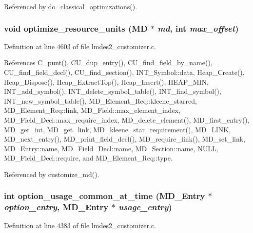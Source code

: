 Referenced by do\_\-classical\_\-optimizations().
\subsubsection{\setlength{\rightskip}{0pt plus 5cm}void optimize\_\-resource\_\-units (\bf{MD} $\ast$ {\em md}, int {\em max\_\-offset})}\label{lmdes2__customizer_8c_2160faed9e117c61232adfb550843aaa}




Definition at line 4603 of file lmdes2\_\-customizer.c.

References C\_\-punt(), CU\_\-dup\_\-entry(), CU\_\-find\_\-field\_\-by\_\-name(), CU\_\-find\_\-field\_\-decl(), CU\_\-find\_\-section(), INT\_\-Symbol::data, Heap\_\-Create(), Heap\_\-Dispose(), Heap\_\-Extract\-Top(), Heap\_\-Insert(), HEAP\_\-MIN, INT\_\-add\_\-symbol(), INT\_\-delete\_\-symbol\_\-table(), INT\_\-find\_\-symbol(), INT\_\-new\_\-symbol\_\-table(), MD\_\-Element\_\-Req::kleene\_\-starred, MD\_\-Element\_\-Req::link, MD\_\-Field::max\_\-element\_\-index, MD\_\-Field\_\-Decl::max\_\-require\_\-index, MD\_\-delete\_\-element(), MD\_\-first\_\-entry(), MD\_\-get\_\-int, MD\_\-get\_\-link, MD\_\-kleene\_\-star\_\-requirement(), MD\_\-LINK, MD\_\-next\_\-entry(), MD\_\-print\_\-field\_\-decl(), MD\_\-require\_\-link(), MD\_\-set\_\-link, MD\_\-Entry::name, MD\_\-Field\_\-Decl::name, MD\_\-Section::name, NULL, MD\_\-Field\_\-Decl::require, and MD\_\-Element\_\-Req::type.

Referenced by customize\_\-md().
\subsubsection{\setlength{\rightskip}{0pt plus 5cm}int option\_\-usage\_\-common\_\-at\_\-time (\bf{MD\_\-Entry} $\ast$ {\em option\_\-entry}, \bf{MD\_\-Entry} $\ast$ {\em usage\_\-entry})}\label{lmdes2__customizer_8c_b3184354774cd9adb6c800a4751ca015}




Definition at line 4383 of file lmdes2\_\-customizer.c.


